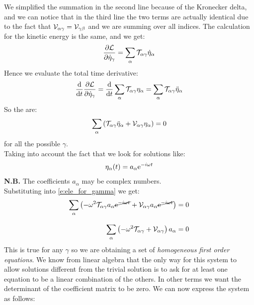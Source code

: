 We simplified the summation in the second line because of the Kronecker delta, and we can notice that in the third line the two terms are actually identical due to the fact that $\mathcal{V}_{\alpha \gamma} = \mathcal{V}_{\gamma \beta}$ and we are summing over all indices. The calculation for the kinetic energy is the same, and we get:
\begin{equation}
    \pdv{\lagr}{\dot{\eta}_{\gamma}} = \bigsum_{\alpha}\Telegant_{\alpha \gamma} \dot{\eta}_{\alpha}
\end{equation}
Hence we evaluate the total time derivative:
\begin{equation}
    \dv{}{t}\pdv{\lagr}{\dot{\eta}_{\gamma}} = \dv{}{t}\bigsum_{\alpha}\Telegant_{\alpha \gamma} \eta_{\alpha} = \bigsum_{\alpha}\Telegant_{\alpha \gamma} \ddot{\eta}_{\alpha}
\end{equation}
So the \eleref\;are:
\begin{equation} \label{e:ele_for_gamma}
    \displaystyle\sum_{\alpha}\left(\mathcal{T}_{\alpha \gamma} \ddot{\eta}_{\alpha} + \mathcal{V}_{\alpha \gamma} \eta_{\alpha}\right) = 0
\end{equation}
for all the possible $\gamma$.\\
Taking into account the fact that we look for solutions like:
\begin{equation}
    \eta_{\alpha} (t) = a_{\alpha}\mathrm{e}^{-i\omega t}
\end{equation}
\textbf{N.B.} The coefficients $a_{\alpha}$ may be complex numbers.\\
Substituting into \eqref{e:ele_for_gamma} we get:
\begin{equation} \label{e:eigenvalue_alpha}
    \begin{split}
        \displaystyle\sum_{\alpha}\left(-\omega^2\mathcal{T}_{\alpha \gamma} a_{\alpha}\cancel{\mathrm{e}^{-i\omega t}} + \mathcal{V}_{\alpha \gamma}a_{\alpha}\cancel{\mathrm{e}^{-i\omega t}}\right) &= 0\\[8pt]
        \displaystyle\sum_{\alpha}\left(-\omega^2\mathcal{T}_{\alpha \gamma} + \mathcal{V}_{\alpha \gamma}\right)a_{\alpha} &= 0
    \end{split}
\end{equation}
This is true for any $\gamma$ so we are obtaining a set of \textit{homogeneous first order equations}. We know from linear algebra that the only way for this system to allow solutions different from the trivial solution is to ask for at least one equation to be a linear combination of the others.
In other terms we want the determinant of the coefficient matrix to be zero. We can now express the system as follows:

